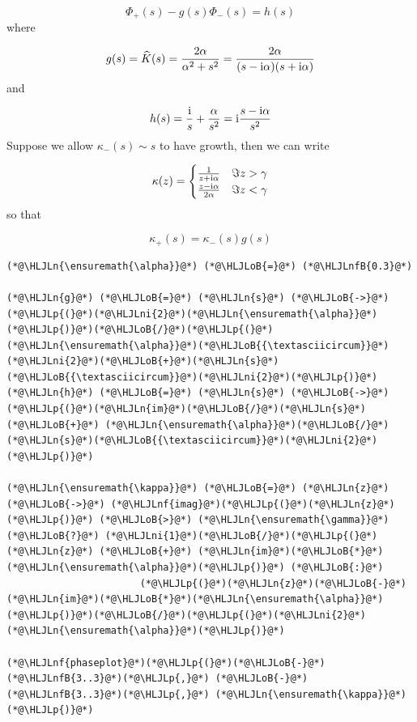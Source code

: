 \documentclass[12pt,a4paper]{article}
\newcommand{\HLJLn}[1]{#1}
\newcommand{\HLJLnf}[1]{\textcolor[RGB]{66,102,213}{#1}}
\newcommand{\HLJLnfB}[1]{\textcolor[RGB]{59,151,46}{#1}}
\newcommand{\HLJLni}[1]{\textcolor[RGB]{59,151,46}{#1}}
\newcommand{\HLJLoB}[1]{\textcolor[RGB]{102,102,102}{\textbf{#1}}}
\newcommand{\HLJLp}[1]{#1}
\def\I{ {\rm i} }
\begin{document}
\[
\Phi_+(s) - g(s) \Phi_-(s) = h(s)
\]
where 

\[
g(s) = \widehat K(s) = {2\alpha \over \alpha^2 +s^2}= {2 \alpha \over (s-\I \alpha)(s+\I \alpha)}
\]
and

\[
h(s) = {\I \over s} + {\alpha \over s^2} = \I {s -\I \alpha \over s^2}
\]
Suppose we allow $\kappa_-(s) \sim s$ to have growth, then we can write

\[
\kappa(z) = \begin{cases} {1 \over z+\I \alpha }& \Im z > \gamma \\
                        {z-\I \alpha \over 2 \alpha} & \Im z < \gamma
\end{cases}
\]
so that 

\[
\kappa_+(s) = \kappa_-(s) g(s)
\]

\begin{lstlisting}
(*@\HLJLn{\ensuremath{\alpha}}@*) (*@\HLJLoB{=}@*) (*@\HLJLnfB{0.3}@*)

(*@\HLJLn{g}@*) (*@\HLJLoB{=}@*) (*@\HLJLn{s}@*) (*@\HLJLoB{->}@*) (*@\HLJLp{(}@*)(*@\HLJLni{2}@*)(*@\HLJLn{\ensuremath{\alpha}}@*)(*@\HLJLp{)}@*)(*@\HLJLoB{/}@*)(*@\HLJLp{(}@*)(*@\HLJLn{\ensuremath{\alpha}}@*)(*@\HLJLoB{{\textasciicircum}}@*)(*@\HLJLni{2}@*)(*@\HLJLoB{+}@*)(*@\HLJLn{s}@*)(*@\HLJLoB{{\textasciicircum}}@*)(*@\HLJLni{2}@*)(*@\HLJLp{)}@*)
(*@\HLJLn{h}@*) (*@\HLJLoB{=}@*) (*@\HLJLn{s}@*) (*@\HLJLoB{->}@*) (*@\HLJLp{(}@*)(*@\HLJLn{im}@*)(*@\HLJLoB{/}@*)(*@\HLJLn{s}@*) (*@\HLJLoB{+}@*) (*@\HLJLn{\ensuremath{\alpha}}@*)(*@\HLJLoB{/}@*)(*@\HLJLn{s}@*)(*@\HLJLoB{{\textasciicircum}}@*)(*@\HLJLni{2}@*)(*@\HLJLp{)}@*)

(*@\HLJLn{\ensuremath{\kappa}}@*) (*@\HLJLoB{=}@*) (*@\HLJLn{z}@*) (*@\HLJLoB{->}@*) (*@\HLJLnf{imag}@*)(*@\HLJLp{(}@*)(*@\HLJLn{z}@*)(*@\HLJLp{)}@*) (*@\HLJLoB{>}@*) (*@\HLJLn{\ensuremath{\gamma}}@*) (*@\HLJLoB{?}@*) (*@\HLJLni{1}@*)(*@\HLJLoB{/}@*)(*@\HLJLp{(}@*)(*@\HLJLn{z}@*) (*@\HLJLoB{+}@*) (*@\HLJLn{im}@*)(*@\HLJLoB{*}@*)(*@\HLJLn{\ensuremath{\alpha}}@*)(*@\HLJLp{)}@*) (*@\HLJLoB{:}@*)
                       (*@\HLJLp{(}@*)(*@\HLJLn{z}@*)(*@\HLJLoB{-}@*)(*@\HLJLn{im}@*)(*@\HLJLoB{*}@*)(*@\HLJLn{\ensuremath{\alpha}}@*)(*@\HLJLp{)}@*)(*@\HLJLoB{/}@*)(*@\HLJLp{(}@*)(*@\HLJLni{2}@*)(*@\HLJLn{\ensuremath{\alpha}}@*)(*@\HLJLp{)}@*)

(*@\HLJLnf{phaseplot}@*)(*@\HLJLp{(}@*)(*@\HLJLoB{-}@*)(*@\HLJLnfB{3..3}@*)(*@\HLJLp{,}@*) (*@\HLJLoB{-}@*)(*@\HLJLnfB{3..3}@*)(*@\HLJLp{,}@*) (*@\HLJLn{\ensuremath{\kappa}}@*)(*@\HLJLp{)}@*)
\end{lstlisting}
\end{document}
